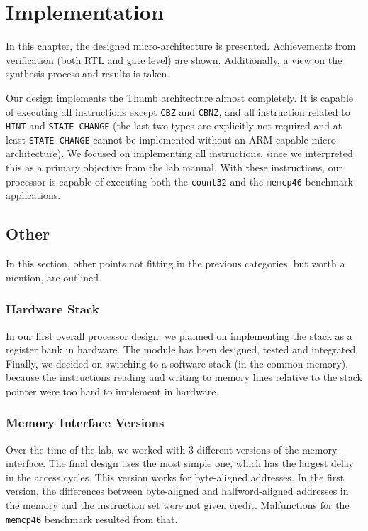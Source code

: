 \chapter{Implementation}
\label{cha:implementation}

In this chapter, the designed micro-architecture is presented. Achievements from verification (both RTL and gate level) are shown. Additionally, a view on the synthesis process and results is taken.

Our design implements the Thumb architecture almost completely. It is capable of executing all instructions except \texttt{CBZ} and \texttt{CBNZ}, and all instruction related to \texttt{HINT} and \texttt{STATE CHANGE} (the last two types are explicitly not required and at least \texttt{STATE CHANGE} cannot be implemented without an ARM-capable micro-architecture). We focused on implementing all instructions, since we interpreted this as a primary objective from the lab manual. With these instructions, our processor is capable of executing both the \texttt{count32} and the \texttt{memcp46} benchmark applications.






\section{Other}
\label{sec:other}
In this section, other points not fitting in the previous categories, but worth a mention, are outlined.

\subsection{Hardware Stack}
\label{subsec:hardwarestack}
In our first overall processor design, we planned on implementing the stack as a register bank in hardware. The module has been designed, tested and integrated. Finally, we decided on switching to a software stack (in the common memory), because the instructions reading and writing to memory lines relative to the stack pointer were too hard to implement in hardware. 

\subsection{Memory Interface Versions}
\label{subsec:memoryinterfaceversions}
Over the time of the lab, we worked with 3 different versions of the memory interface. The final design uses the most simple one, which has the largest delay in the access cycles. This version works for byte-aligned addresses. In the first version, the differences between byte-aligned and halfword-aligned addresses in the memory and the instruction set were not given credit. Malfunctions for the \texttt{memcp46} benchmark resulted from that.

